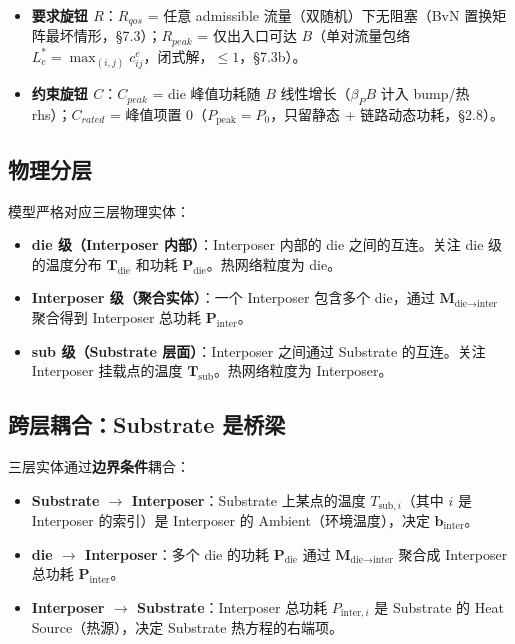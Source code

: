 \documentclass[11pt]{article}
\newcommand{\bv}{\mathbf}
\begin{document}
\begin{itemize}
\item \textbf{要求旋钮 $R$}：$R_{qos}$ = 任意 admissible 流量（双随机）下无阻塞（BvN 置换矩阵最坏情形，§7.3）；$R_{peak}$ = 仅出入口可达 $B$（单对流量包络 $L_e^{*} = \max_{(i,j)} c_{ij}^{e}$，闭式解，$\le 1$，§7.3b）。
\item \textbf{约束旋钮 $C$}：$C_{peak}$ = die 峰值功耗随 $B$ 线性增长（$\beta_P B$ 计入 bump/热 rhs）；$C_{rated}$ = 峰值项置 0（$P_{\text{peak}} = P_0$，只留静态 + 链路动态功耗，§2.8）。
\end{itemize}

\subsection{物理分层}

模型严格对应三层物理实体：
\begin{itemize}
\item \textbf{die 级（Interposer 内部）}：Interposer 内部的 die 之间的互连。关注 die 级的温度分布 $\bv{T}_{\text{die}}$ 和功耗 $\bv{P}_{\text{die}}$。热网络粒度为 die。
\item \textbf{Interposer 级（聚合实体）}：一个 Interposer 包含多个 die，通过 $\bv{M}_{\text{die} \to \text{inter}}$ 聚合得到 Interposer 总功耗 $\bv{P}_{\text{inter}}$。
\item \textbf{sub 级（Substrate 层面）}：Interposer 之间通过 Substrate 的互连。关注 Interposer 挂载点的温度 $\bv{T}_{\text{sub}}$。热网络粒度为 Interposer。
\end{itemize}

\subsection{跨层耦合：Substrate 是桥梁}

三层实体通过\textbf{边界条件}耦合：
\begin{itemize}
\item \textbf{Substrate $\to$ Interposer}：Substrate 上某点的温度 $T_{\text{sub},i}$（其中 $i$ 是 Interposer 的索引）是 Interposer 的 Ambient（环境温度），决定 $\bv{b}_{\text{inter}}$。
\item \textbf{die $\to$ Interposer}：多个 die 的功耗 $\bv{P}_{\text{die}}$ 通过 $\bv{M}_{\text{die} \to \text{inter}}$ 聚合成 Interposer 总功耗 $\bv{P}_{\text{inter}}$。
\item \textbf{Interposer $\to$ Substrate}：Interposer 总功耗 $P_{\text{inter},i}$ 是 Substrate 的 Heat Source（热源），决定 Substrate 热方程的右端项。
\end{itemize}
\end{document}
